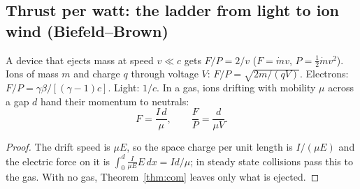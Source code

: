 \setcounter{section}{3}\setcounter{subsection}{3}
\subsection{Thrust per watt: the ladder from light to ion wind (Biefeld--Brown)}
\begin{statement}
A device that ejects mass at speed $v\ll c$ gets $F/P=2/v$ ($F=\dot mv$, $P=\tfrac12\dot mv^2$). Ions of mass $m$ and charge $q$ through voltage
$V$: $F/P=\sqrt{2m/(qV)}$. Electrons: $F/P=\gamma\beta/[(\gamma-1)c]$. Light: $1/c$. In a gas, ions drifting with mobility $\mu$ across a gap $d$
hand their momentum to neutrals:
\begin{equation}
F=\frac{I\,d}{\mu},\qquad \frac FP=\frac{d}{\mu V}.\label{eq:ehd}
\end{equation}
\end{statement}
\begin{proof}
The drift speed is $\mu E$, so the space charge per unit length is $I/(\mu E)$ and the electric force on it is $\int_0^d\frac{I}{\mu E}E\,dx=Id/\mu$;
in steady state collisions pass this to the gas. With no gas, Theorem~\ref{thm:com} leaves only what is ejected.
\end{proof}

\setcounter{section}{5}\setcounter{subsection}{5}
